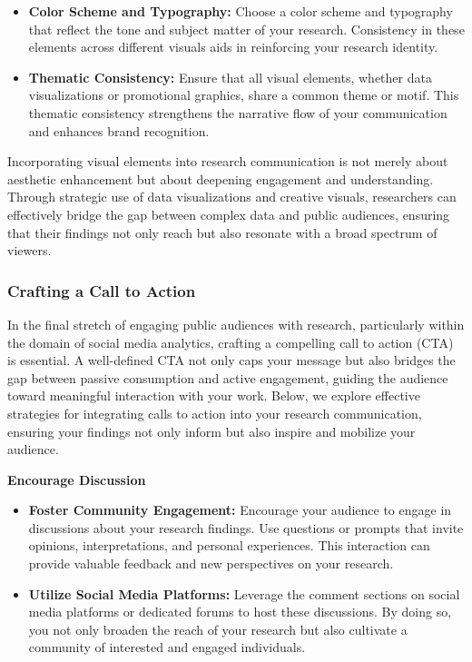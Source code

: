 \documentclass[
]{book}
\begin{document}
\begin{itemize}
\item
  \textbf{Color Scheme and Typography:} Choose a color scheme and typography that reflect the tone and subject matter of your research. Consistency in these elements across different visuals aids in reinforcing your research identity.
\item
  \textbf{Thematic Consistency:} Ensure that all visual elements, whether data visualizations or promotional graphics, share a common theme or motif. This thematic consistency strengthens the narrative flow of your communication and enhances brand recognition.
\end{itemize}

Incorporating visual elements into research communication is not merely about aesthetic enhancement but about deepening engagement and understanding. Through strategic use of data visualizations and creative visuals, researchers can effectively bridge the gap between complex data and public audiences, ensuring that their findings not only reach but also resonate with a broad spectrum of viewers.

\hypertarget{crafting-a-call-to-action}{%
\subsubsection*{Crafting a Call to Action}\label{crafting-a-call-to-action}}

In the final stretch of engaging public audiences with research, particularly within the domain of social media analytics, crafting a compelling call to action (CTA) is essential. A well-defined CTA not only caps your message but also bridges the gap between passive consumption and active engagement, guiding the audience toward meaningful interaction with your work. Below, we explore effective strategies for integrating calls to action into your research communication, ensuring your findings not only inform but also inspire and mobilize your audience.

\textbf{Encourage Discussion}

\begin{itemize}
\item
  \textbf{Foster Community Engagement:} Encourage your audience to engage in discussions about your research findings. Use questions or prompts that invite opinions, interpretations, and personal experiences. This interaction can provide valuable feedback and new perspectives on your research.
\item
  \textbf{Utilize Social Media Platforms:} Leverage the comment sections on social media platforms or dedicated forums to host these discussions. By doing so, you not only broaden the reach of your research but also cultivate a community of interested and engaged individuals.
\end{itemize}
\end{document}
